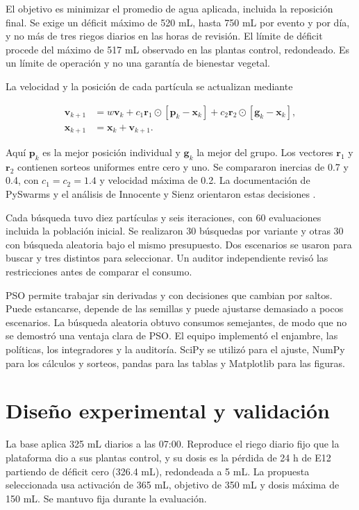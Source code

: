 \documentclass[12pt]{article}
\begin{document}
El objetivo es minimizar el promedio de agua aplicada, incluida la reposición final. Se exige un déficit máximo de 520 mL, hasta 750 mL por evento y por día, y no más de tres riegos diarios en las horas de revisión. El límite de déficit procede del máximo de 517 mL observado en las plantas control, redondeado. Es un límite de operación y no una garantía de bienestar vegetal.

La velocidad y la posición de cada partícula se actualizan mediante

\begin{align*}
\mathbf{v}_{k+1}&=w\mathbf{v}_k+c_1\mathbf{r}_1\odot\left[\mathbf{p}_k-\mathbf{x}_k\right]
+c_2\mathbf{r}_2\odot\left[\mathbf{g}_k-\mathbf{x}_k\right],\\
\mathbf{x}_{k+1}&=\mathbf{x}_k+\mathbf{v}_{k+1}.
\end{align*}

Aquí $\mathbf{p}_k$ es la mejor posición individual y $\mathbf{g}_k$ la mejor del grupo. Los vectores $\mathbf{r}_1$ y $\mathbf{r}_2$ contienen sorteos uniformes entre cero y uno. Se compararon inercias de 0.7 y 0.4, con $c_1=c_2=1.4$ y velocidad máxima de 0.2. La documentación de PySwarms y el análisis de Innocente y Sienz orientaron estas decisiones \cite{pyswarms,innocente}.

Cada búsqueda tuvo diez partículas y seis iteraciones, con 60 evaluaciones incluida la población inicial. Se realizaron 30 búsquedas por variante y otras 30 con búsqueda aleatoria bajo el mismo presupuesto. Dos escenarios se usaron para buscar y tres distintos para seleccionar. Un auditor independiente revisó las restricciones antes de comparar el consumo.

PSO permite trabajar sin derivadas y con decisiones que cambian por saltos. Puede estancarse, depende de las semillas y puede ajustarse demasiado a pocos escenarios. La búsqueda aleatoria obtuvo consumos semejantes, de modo que no se demostró una ventaja clara de PSO. El equipo implementó el enjambre, las políticas, los integradores y la auditoría. SciPy se utilizó para el ajuste, NumPy para los cálculos y sorteos, pandas para las tablas y Matplotlib para las figuras.

\section{Diseño experimental y validación}

La base aplica 325 mL diarios a las 07:00. Reproduce el riego diario fijo que la plataforma dio a sus plantas control, y su dosis es la pérdida de 24 h de E12 partiendo de déficit cero (326.4 mL), redondeada a 5 mL. La propuesta seleccionada usa activación de 365 mL, objetivo de 350 mL y dosis máxima de 150 mL. Se mantuvo fija durante la evaluación.
\end{document}
